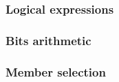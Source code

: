 \documentclass[letter,11pt]{article}
\begin{document}
\subsubsection{Logical expressions}


\subsubsection{Bits arithmetic}

\subsubsection{Member selection}
\end{document}
